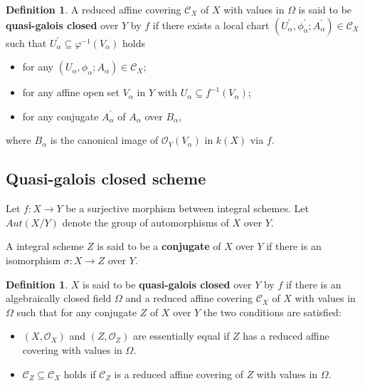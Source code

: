 \documentclass[12pt,twoside,reqno]{amsart}
\theoremstyle{definition}
\newtheorem{definition}[theorem]{Definition}
\numberwithin{equation}{section}
\begin{document}
\begin{definition}
A reduced affine covering $\mathcal{C}_{X}$ of $X$ with values in $\Omega $
is said to be \textbf{quasi-galois closed} over $Y$ by $f$ if there exists a local chart $(U_{\alpha }^{\prime },\phi _{\alpha }^{\prime
};A_{\alpha }^{\prime })\in \mathcal{C}_{X}$ such that $U_{\alpha }^{\prime
}\subseteq \varphi^{-1}(V_{\alpha})$ holds
\begin{itemize}
\item for any $(U_{\alpha },\phi _{\alpha
};A_{\alpha })\in \mathcal{C}_{X}$;

\item for any affine open set $V_{\alpha}$ in $
Y$ with $U_{\alpha }\subseteq f^{-1}(V_{\alpha})$;

\item for any
conjugate $A_{\alpha }^{\prime }$ of $A_{\alpha }$ over $B_{\alpha}$,
\end{itemize}
 where $
B_{\alpha}$ is the canonical image of $\mathcal{O}_{ Y}(V_{\alpha})$ in  $k(X)$ via $f$.
\end{definition}


\subsection{Quasi-galois closed scheme}

Let  $f:X\rightarrow Y$ be a
surjective morphism between integral schemes. Let $Aut\left( X/Y\right) $ denote the group of
automorphisms of $X$ over $Y$.

A integral scheme $Z$ is said to be a \textbf{conjugate} of $X$ over $Y$ if
there is an isomorphism $\sigma :X\rightarrow Z$ over $Y$.

\begin{definition}
$X$ is said to be \textbf{quasi-galois closed} over $Y$ by $f$ if there is an algebraically closed field $\Omega$
and a reduced affine covering $\mathcal{C}_{X}$ of $X$ with values in $
\Omega $ such that for any conjugate $Z$ of
$X$ over $Y$ the two conditions are satisfied:
\begin{itemize}
\item $(X,\mathcal{O}_{X})$ and $(Z,\mathcal{O}_{Z})$ are essentially equal if $Z$ has a reduced
affine covering with values in $\Omega$.

\item $\mathcal{C}_{Z}\subseteq \mathcal{C}_{X}$ holds if $\mathcal{C}_{Z}$
is a reduced affine covering of $Z$ with values in $\Omega $.
\end{itemize}
\end{definition}
\end{document}
